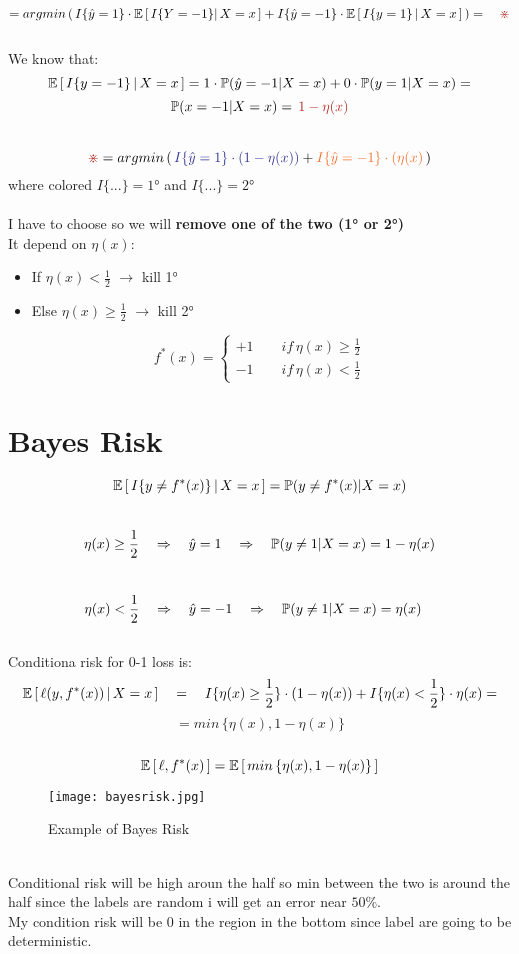 \documentclass[../main.tex]{subfiles}
\begin{document}
\\
$$
= argmin \, (  \, I\{\hat{y} = 1\} \cdot \barra{E} \left[ \, I\{Y=-1\} |\, X = x\, \right] + I\{\hat{y}=-1\} \cdot \barra{E} \left[ \, I\{y=1\} \, | \, X = x \, \right] \, ) =  \quad \red{\divideontimes}
$$\\
We know that: $$ \mathbb{E} \left[ \, I \{y = -1 \} \, | \, X = x \, \right] = 1 \cdot \mathbb{P} \\ (\hat{y} = -1 | X = x ) + 0 \cdot \mathbb{P} (y = 1 | X= x) =  
$$
$$
\barra{P} (x = -1 | X=x ) = \, \red{ 1- \eta(x) }
$$\\
$$
 \red{\divideontimes} =   argmin \, (  \, \col{I\{\hat{y} = 1\} \cdot (1 - \eta(x))}{Blue} + \col{I \{ \hat{y} = -1\} \cdot (\eta(x)}{Orange} \, )
$$
where  colored $I \{...\} = 1$° and  $I \{...\} = 2$°
\\\\
I have to choose  so we will \textbf{remove one of the two (1° or 2°) }
\\
It depend on $\eta(x)$:
\begin{itemize}
\item  If $\eta(x) < \frac{1}{2}$ \quad $\longrightarrow$ \quad kill 1°
\item  Else $\eta(x) \geq \frac{1}{2}$ \quad $\longrightarrow$ \quad kill 2°
\end{itemize}
$$
f^*(x) = 
\begin{cases}
+1 \qquad if \, \eta(x) \geq \frac{1}{2}\\
-1 \qquad if \, \eta(x) < \frac{1}{2}
\end{cases}
$$
\section{Bayes Risk}

$$
\mathbb{E} \left[ \, I \{ y \neq f^*(x) \}\, | \, X = x \, \right] = \mathbb{P}(y \neq f^*(x)|X= x)
$$\
$$
\eta(x) \geq \frac{1}{2} \quad \Rightarrow \quad \hat{y} = 1  \quad \Rightarrow \quad  \mathbb{P} (y \neq 1 | X= x) = 1-\eta(x)
$$\
$$
\eta(x) < \frac{1}{2} \quad \Rightarrow \quad \hat{y} = -1  \quad \Rightarrow \quad  \mathbb{P} (y \neq 1 | X= x) = \eta(x) \quad
$$
\\
Conditiona risk for 0-1 loss is:
\\
$$
\mathbb{E} \left[ \, \ell (y, f^*(x)) \, | \, X = x \, \right] 
\quad = \quad I \{ \eta(x) \geq \frac{1}{2}\} \cdot(1-\eta(x)) + I \{ \eta(x) <\frac{1}{2}\} \cdot \eta(x) = 
$$
$$
 = min \, \{ \eta(x), 1- \eta(x) \}
$$\
$$
\mathbb{E} \left[ \, \ell , f^*(x) \, \right] = \mathbb{E} \left[ \, min \, \{ \eta(x) , 1- \eta(x) \} \, \right] 
$$
\begin{figure}[h]
    \centering
    \texttt{[image: bayesrisk.jpg]}
    \caption{Example of Bayes Risk}
\end{figure}
\\
Conditional risk will be high aroun the half so min between the two is around
the half since the labels are random i will get an error near $50\%$.\\
My condition risk will be 0 in the region in the bottom since label are going to
be deterministic.
\end{document}
